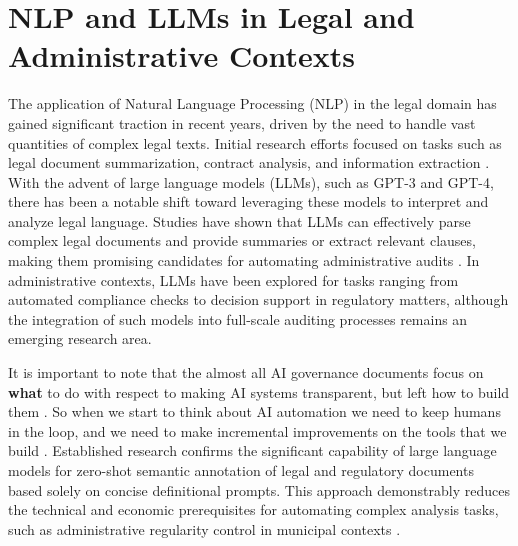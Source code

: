 \documentclass[../main.tex]{subfiles}
\begin{document}




\section*{NLP and LLMs in Legal and Administrative Contexts}
The application of Natural Language Processing (NLP) in the legal domain has gained significant traction in recent years, driven by the need to handle vast quantities of complex legal texts. Initial research efforts focused on tasks such as legal document summarization, contract analysis, and information extraction \cite{katz_natural_2023}. With the advent of large language models (LLMs), such as GPT-3 and GPT-4, there has been a notable shift toward leveraging these models to interpret and analyze legal language. Studies have shown that LLMs can effectively parse complex legal documents and provide summaries or extract relevant clauses, making them promising candidates for automating administrative audits \cite{ariai_natural_2025}. In administrative contexts, LLMs have been explored for tasks ranging from automated compliance checks to decision support in regulatory matters, although the integration of such models into full-scale auditing processes remains an emerging research area. 

It is important to note that the almost all AI governance documents focus on \textbf{what} to do with respect to making AI systems transparent, but left how to build them \cite{bell_think_2022}. So when we start to think about AI automation we need to keep humans in the loop, and we need to make incremental improvements on the tools that we build \cite{ibrahim_beyond_2024}. Established research confirms the significant capability of large language models for zero-shot semantic annotation of legal and regulatory documents based solely on concise definitional prompts. This approach demonstrably reduces the technical and economic prerequisites for automating complex analysis tasks, such as administrative regularity control in municipal contexts \cite{savelka_unreasonable_2023}.
\end{document}

